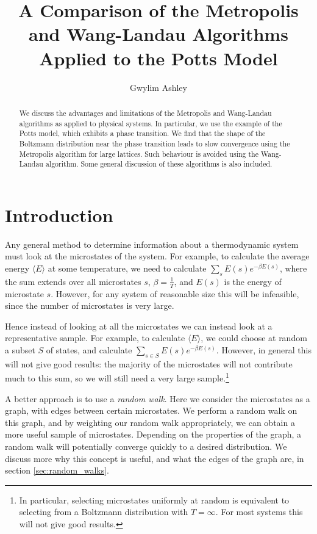 \documentclass{article}
\author{Gwylim Ashley}
\title{A Comparison of the Metropolis and Wang-Landau Algorithms Applied to the Potts Model}
\begin{document}
\maketitle
\begin{abstract}
We discuss the advantages and limitations of the Metropolis and Wang-Landau algorithms as applied to physical systems.
In particular, we use the example of the Potts model, which exhibits a phase transition.
We find that the shape of the Boltzmann distribution near the phase transition leads to slow convergence using the Metropolis algorithm for large lattices.
Such behaviour is avoided using the Wang-Landau algorithm.
Some general discussion of these algorithms is also included.
\end{abstract}
\tableofcontents
\section{Introduction}
Any general method to determine information about a thermodynamic system must look at the microstates of the system.
For example, to calculate the average energy $\langle E\rangle$ at some temperature, we need to calculate $\sum_s E(s)e^{-\beta E(s)}$, where the sum extends over all microstates $s$, $\beta = \frac{1}{T}$, and $E(s)$ is the energy of microstate $s$.
However, for any system of reasonable size this will be infeasible, since the number of microstates is very large.

Hence instead of looking at all the microstates we can instead look at a representative sample.
For example, to calculate $\langle E\rangle$, we could choose at random a subset $S$ of states, and calculate $\sum_{s\in S}E(s)e^{-\beta E(s)}$.
However, in general this will not give good results: the majority of the microstates will not contribute much to this sum, so we will still need a very large sample.\footnote{In particular, selecting microstates uniformly at random is equivalent to selecting from a Boltzmann distribution with $T = \infty$. For most systems this will not give good results.}

A better approach is to use a \emph{random walk}.
Here we consider the microstates as a graph, with edges between certain microstates.
We perform a random walk on this graph, and by weighting our random walk appropriately, we can obtain a more useful sample of microstates.
Depending on the properties of the graph, a random walk will potentially converge quickly to a desired distribution.
We discuss more why this concept is useful, and what the edges of the graph are, in section \ref{sec:random_walks}.
\end{document}
